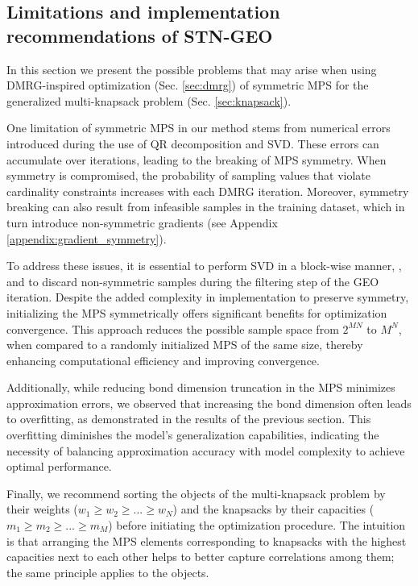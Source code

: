 \subsection{Limitations and implementation recommendations of STN-GEO}\label{sec:limitations}

In this section we present the possible problems that may arise when using DMRG-inspired optimization (Sec. \ref{sec:dmrg}) of symmetric MPS for the generalized multi-knapsack problem (Sec. \ref{sec:knapsack}).

One limitation of symmetric MPS in our method stems from numerical errors introduced during the use of QR decomposition and SVD. These errors can accumulate over iterations, leading to the breaking of MPS symmetry. When symmetry is compromised, the probability of sampling values that violate cardinality constraints increases with each DMRG iteration. Moreover, symmetry breaking can also result from infeasible samples in the training dataset, which in turn introduce non-symmetric gradients (see Appendix \ref{appendix:gradient_symmetry}).

To address these issues, it is essential to perform SVD in a block-wise manner, \cite{PhysRevB.83.115125}, and to discard non-symmetric samples during the filtering step of the GEO iteration. Despite the added complexity in implementation to preserve symmetry, initializing the MPS symmetrically offers significant benefits for optimization convergence. This approach reduces the possible sample space from $2^{MN}$ to $M^N$, when compared to a randomly initialized MPS of the same size, thereby enhancing computational efficiency and improving convergence.

Additionally, while reducing bond dimension truncation in the MPS minimizes approximation errors, we observed that increasing the bond dimension often leads to overfitting, as demonstrated in the results of the previous section. This overfitting diminishes the model's generalization capabilities, indicating the necessity of balancing approximation accuracy with model complexity to achieve optimal performance.

 Finally, we recommend sorting the objects of the multi-knapsack problem by their weights ($w_{1}\geq w_2\geq...\geq w_{N}$) and the knapsacks by their capacities ($m_{1}\geq m_2\geq...\geq m_{M}$) before initiating the optimization procedure. The intuition is that arranging the MPS elements corresponding to knapsacks with the highest capacities next to each other helps to better capture correlations among them; the same principle applies to the objects.